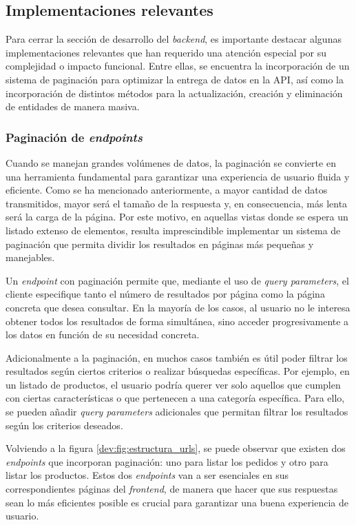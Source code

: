 \subsection{Implementaciones relevantes}
\label{dev:subsec:implementaciones_relevantes}

Para cerrar la sección de desarrollo del \textit{backend}, es importante destacar algunas implementaciones relevantes que han requerido una atención especial por su complejidad o impacto funcional. Entre ellas, se encuentra la incorporación de un sistema de paginación para optimizar la entrega de datos en la API, así como la incorporación de distintos métodos para la actualización, creación y eliminación de entidades de manera masiva.

\subsubsection{Paginación de \textit{endpoints}}
\label{dev:subsubsec:paginacion_endpoints}

Cuando se manejan grandes volúmenes de datos, la paginación se convierte en una herramienta fundamental para garantizar una experiencia de usuario fluida y eficiente. Como se ha mencionado anteriormente, a mayor cantidad de datos transmitidos, mayor será el tamaño de la respuesta y, en consecuencia, más lenta será la carga de la página. Por este motivo, en aquellas vistas donde se espera un listado extenso de elementos, resulta imprescindible implementar un sistema de paginación que permita dividir los resultados en páginas más pequeñas y manejables.

Un \textit{endpoint} con paginación permite que, mediante el uso de \textit{query parameters}, el cliente especifique tanto el número de resultados por página como la página concreta que desea consultar. En la mayoría de los casos, al usuario no le interesa obtener todos los resultados de forma simultánea, sino acceder progresivamente a los datos en función de su necesidad concreta.

Adicionalmente a la paginación, en muchos casos también es útil poder filtrar los resultados según ciertos criterios o realizar búsquedas específicas. Por ejemplo, en un listado de productos, el usuario podría querer ver solo aquellos que cumplen con ciertas características o que pertenecen a una categoría específica. Para ello, se pueden añadir \textit{query parameters} adicionales que permitan filtrar los resultados según los criterios deseados.

Volviendo a la figura \ref{dev:fig:estructura_urls}, se puede observar que existen dos \textit{endpoints} que incorporan paginación: uno para listar los pedidos y otro para listar los productos. Estos dos \textit{endpoints} van a ser esenciales en sus correspondientes páginas del \textit{frontend}, de manera que hacer que sus respuestas sean lo más eficientes posible es crucial para garantizar una buena experiencia de usuario.

